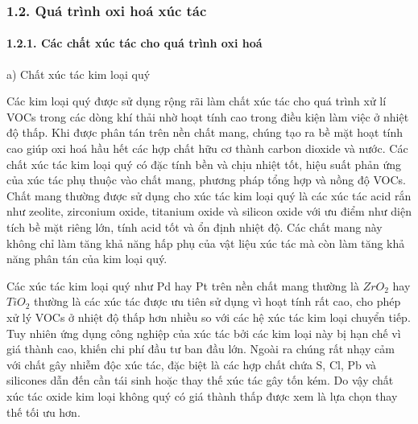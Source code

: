 \documentclass{article} %
\begin{document}
\subsubsection*{1.2. Quá trình oxi hoá xúc tác}
 {}

\paragraph*{1.2.1. Các chất xúc tác cho quá trình oxi hoá}
\leavevmode

a) Chất xúc tác kim loại quý

Các kim loại quý được sử dụng rộng rãi làm chất xúc tác cho quá trình xử lí VOCs trong các dòng khí thải nhờ hoạt tính cao trong điều kiện làm việc ở nhiệt độ thấp. Khi được phân tán trên nền chất mang, chúng tạo ra bề mặt hoạt tính cao giúp oxi hoá hầu hết các hợp chất hữu cơ thành carbon dioxide và nước. Các chất xúc tác kim loại quý có đặc tính bền và chịu nhiệt tốt, hiệu suất phản ứng của xúc tác phụ thuộc vào chất mang, phương pháp tổng hợp và nồng độ VOCs. Chất mang thường được sử dụng cho xúc tác kim loại quý là các xúc tác acid rắn như zeolite, zirconium oxide, titanium oxide và silicon oxide với ưu điểm như diện tích bề mặt riêng lớn, tính acid tốt và ổn định nhiệt độ. Các chất mang này không chỉ làm tăng khả năng hấp phụ của vật liệu xúc tác mà còn làm tăng khả năng phân tán của kim loại quý.

Các xúc tác kim loại quý như Pd hay Pt trên nền chất mang thường là $ZrO_2$ hay $TiO_2$ thường là các xúc tác được ưu tiên sử dụng vì hoạt tính rất cao, cho phép xử lý VOCs ở nhiệt độ thấp hơn nhiều so với các hệ xúc tác kim loại chuyển tiếp. Tuy nhiên ứng dụng công nghiệp của xúc tác bởi các kim loại này bị hạn chế vì giá thành cao, khiến chi phí đầu tư ban đầu lớn. Ngoài ra chúng rất nhạy cảm với chất gây nhiễm độc xúc tác, đặc biệt là các hợp chất chứa S, Cl, Pb và silicones dẫn đến cần tái sinh hoặc thay thế xúc tác gây tốn kém. Do vậy chất xúc tác oxide kim loại không quý có giá thành thấp được xem là lựa chọn thay thế tối ưu hơn.
\end{document}
